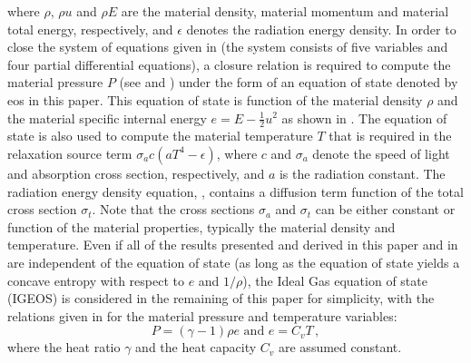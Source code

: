 \documentclass[review]{elsarticle}
\begin{document}
where $\rho$, $\rho u$ and $\rho E$ are the material density, material momentum and material total energy, respectively, and $\epsilon$ denotes the radiation energy density. In order to close the system of equations given in  (the system consists of five variables and four partial differential equations), a closure relation is required to compute the material pressure $P$ (see  and ) under the form of an equation of state denoted by eos in this paper. This equation of state is function of the material density $\rho$ and the material specific internal energy $e = E - \tfrac 1 2 u^2$ as shown in . The equation of state is also used to compute the material temperature $T$ that is required in the relaxation source term $\sigma_a c \left( a T^4 - \epsilon \right)$, where $c$ and $\sigma_a$ denote the speed of light and absorption cross section, respectively, and $a$ is the radiation constant. The radiation energy density equation, , contains a diffusion term function of the total cross section $\sigma_t$. Note that the cross sections $\sigma_a$ and $\sigma_t$ can be either constant or function of the material properties, typically the material density and temperature. Even if all of the results presented and derived in this paper and in \cite{our_jcp_radhy_paper} are independent of the equation of state (as long as the equation of state yields a concave entropy with respect to $e$ and $1/ \rho$), the Ideal Gas equation of state (IGEOS) is considered in the remaining of this paper for simplicity, with the relations given in  for the material pressure and temperature variables:
%
\begin{equation}\label{eq:IGEOS}
P = (\gamma-1) \rho e \text{ and } e = C_v T \, ,
\end{equation}
%
where the heat ratio $\gamma$ and the heat capacity $C_v$ are assumed constant.
\end{document}
